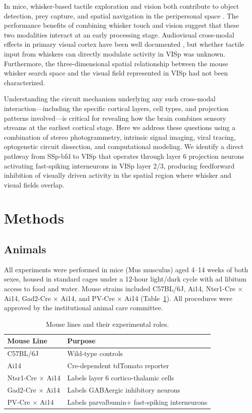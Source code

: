 \documentclass[11pt]{article}
\begin{document}
In mice, whisker-based tactile exploration and vision both contribute to object detection, prey capture, and spatial navigation in the peripersonal space \citep{mitchell2014advances, resulaj2018first}. The performance benefits of combining whisker touch and vision suggest that these two modalities interact at an early processing stage. Audiovisual cross-modal effects in primary visual cortex have been well documented \citep{iurilli2012sound}, but whether tactile input from whiskers can directly modulate activity in VISp was unknown. Furthermore, the three-dimensional spatial relationship between the mouse whisker search space and the visual field represented in VISp had not been characterized.

Understanding the circuit mechanism underlying any such cross-modal interaction---including the specific cortical layers, cell types, and projection patterns involved---is critical for revealing how the brain combines sensory streams at the earliest cortical stage. Here we address these questions using a combination of stereo photogrammetry, intrinsic signal imaging, viral tracing, optogenetic circuit dissection, and computational modeling. We identify a direct pathway from SSp-bfd to VISp that operates through layer 6 projection neurons activating fast-spiking interneurons in VISp layer 2/3, producing feedforward inhibition of visually driven activity in the spatial region where whisker and visual fields overlap.

\section{Methods}

\subsection{Animals}

All experiments were performed in mice (Mus musculus) aged 4--14 weeks of both sexes, housed in standard cages under a 12-hour light/dark cycle with ad libitum access to food and water. Mouse strains included C57BL/6J, Ai14, Ntsr1-Cre $\times$ Ai14, Gad2-Cre $\times$ Ai14, and PV-Cre $\times$ Ai14 (Table~\ref{tab:mice}). All procedures were approved by the institutional animal care committee.

\begin{table}[htbp]
\centering
\caption{Mouse lines and their experimental roles.}
\label{tab:mice}
\begin{tabular}{ll}
\toprule
Mouse Line & Purpose \\
\midrule
C57BL/6J & Wild-type controls \\
Ai14 & Cre-dependent tdTomato reporter \\
Ntsr1-Cre $\times$ Ai14 & Labels layer 6 cortico-thalamic cells \\
Gad2-Cre $\times$ Ai14 & Labels GABAergic inhibitory neurons \\
PV-Cre $\times$ Ai14 & Labels parvalbumin+ fast-spiking interneurons \\
\bottomrule
\end{tabular}
\end{table}
\end{document}
